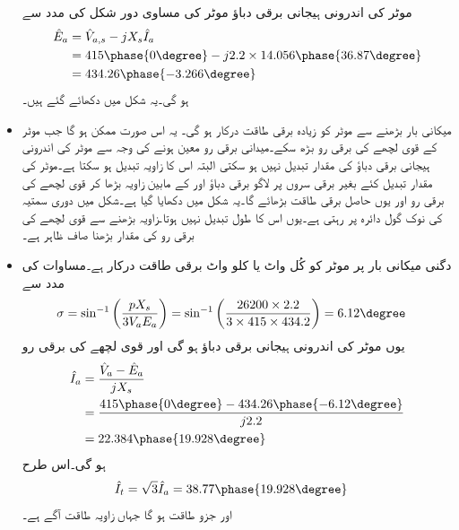 \begin{itemize}
موٹر کی اندرونی ہیجانی برقی دباؤ موٹر کی مساوی دور شکل  کی مدد سے
\begin{align*}
\hat{E}_a&=\hat{V}_{a,s}- j X_s \hat{I}_a\\
&=415 \phase{0\degree}-j 2.2 \times 14.056 \phase{36.87\degree}\\
&=434.26 \phase{-3.266\degree}
\end{align*}
ہو گی۔یہ شکل  میں دکھائے گئے ہیں۔
\item
میکانی بار بڑھنے سے موٹر کو زیادہ برقی طاقت درکار ہو گی۔ یہ اس صورت ممکن ہو گا جب موٹر کے قوی لچھے کی برقی رو بڑھ سکے۔میدانی برقی رو معین ہونے کی وجہ سے موٹر کی اندرونی ہیجانی برقی دباؤ  کی مقدار تبدیل نہیں ہو سکتی البتہ اس کا زاویہ تبدیل ہو سکتا ہے۔موٹر    کی مقدار تبدیل کئے بغیر  برقی سروں پر لاگو برقی دباؤ    اور   کے مابین زاویہ بڑھا کر قوی لچھے کی برقی رو اور یوں حاصل برقی طاقت بڑھائے گا۔یہ شکل  میں دکھایا گیا ہے۔شکل میں  دوری سمتیہ کی نوک گول دائرہ پر رہتی ہے۔یوں اس کا طول تبدیل نہیں ہوتا۔زاویہ بڑھنے سے قوی لچھے کی برقی رو کی مقدار بڑھنا صاف ظاہر ہے۔
\item
دگنی میکانی بار پر موٹر کو کُل   واٹ یا   کلو واٹ برقی طاقت درکار ہے۔مساوات  کی مدد سے
\begin{align*}
\sigma&=\sin^{-1} \left(\frac{p X_s}{3 V_a E_a} \right)=\sin^{-1} \left(\frac{26200 \times 2.2}{3\times 415 \times 434.2} \right)=6.12\degree
\end{align*}
یوں موٹر کی اندرونی ہیجانی برقی دباؤ  ہو گی اور قوی لچھے کی برقی رو
\begin{align*}
\hat{I}_a&=\frac{\hat{V}_a-\hat{E}_a}{j X_s}\\
&=\frac{415\phase{0\degree}-434.26\phase{-6.12\degree}}{j 2.2}\\
&=22.384\phase{19.928\degree}
\end{align*}
ہو گی۔اس طرح 
\begin{align*}
\hat{I}_t&=\sqrt{3} \hat{I}_a=38.77\phase{19.928\degree}
\end{align*}
اور جزو طاقت  ہو گا جہاں زاویہ طاقت آگے ہے۔
\end{itemize}
